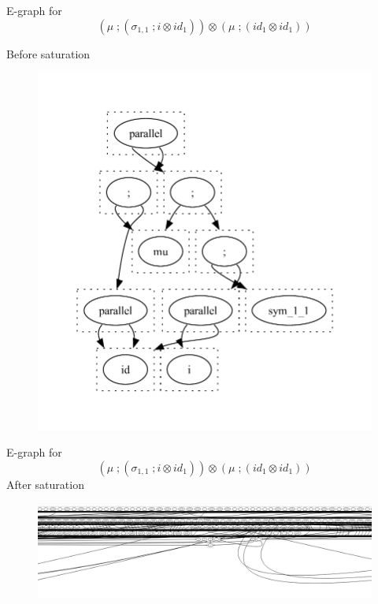 \documentclass[aspectratio=169]{beamer}
\begin{document}
\begin{frame}
    \small
    \begin{example}
        \vspace{1em}
        E-graph for
        \[
            (\mu\;;(\sigma_{1,1}\;;i \otimes id_{1})) \otimes (\mu\;;(id_{1}\otimes id_{1}))
        \]

        Before saturation
        \vspace{-3em}
        \begin{figure}
            \includegraphics[scale=0.4]{figures/egraph_before_saturation_fix.pdf}
        \end{figure}
    \end{example}
\end{frame}

\begin{frame}
    \small
    \begin{example}
        \vspace{1em}
        E-graph for
        \[
            (\mu\;;(\sigma_{1,1}\;;i \otimes id_{1})) \otimes (\mu\;;(id_{1}\otimes id_{1}))
        \]
        After saturation
        \begin{figure}
            \includegraphics[width=0.9\linewidth]{figures/dot_5.jpeg}
        \end{figure}
        
        \end{example}
\end{frame}
\end{document}
